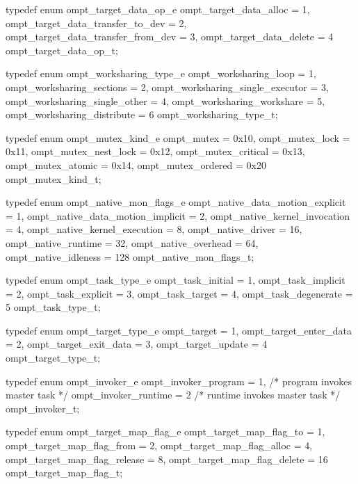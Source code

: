 \documentclass{article}
\begin{document}
\begin{boxedcode}
typedef enum ompt\_target\_data\_op\_e {
  ompt\_target\_data\_alloc              = 1,
  ompt\_target\_data\_transfer\_to\_dev    = 2,
  ompt\_target\_data\_transfer\_from\_dev  = 3,
  ompt\_target\_data\_delete             = 4
} ompt\_target\_data\_op\_t;

typedef enum ompt\_worksharing\_type\_e {
  ompt\_worksharing\_loop               = 1, 
  ompt\_worksharing\_sections           = 2,
  ompt\_worksharing\_single\_executor    = 3,
  ompt\_worksharing\_single\_other       = 4,
  ompt\_worksharing\_workshare          = 5,
  ompt\_worksharing\_distribute         = 6
} ompt\_worksharing\_type\_t;

typedef enum ompt\_mutex\_kind\_e {
  ompt\_mutex                          = 0x10,
  ompt\_mutex\_lock                     = 0x11,
  ompt\_mutex\_nest\_lock                = 0x12,
  ompt\_mutex\_critical                 = 0x13,
  ompt\_mutex\_atomic                   = 0x14,
  ompt\_mutex\_ordered                  = 0x20
} ompt\_mutex\_kind\_t;

typedef enum ompt\_native\_mon\_flags\_e {
  ompt\_native\_data\_motion\_explicit    = 1,
  ompt\_native\_data\_motion\_implicit    = 2,
  ompt\_native\_kernel\_invocation       = 4,
  ompt\_native\_kernel\_execution        = 8,
  ompt\_native\_driver                  = 16,
  ompt\_native\_runtime                 = 32,
  ompt\_native\_overhead                = 64,
  ompt\_native\_idleness                = 128
} ompt\_native\_mon\_flags\_t;

typedef enum  ompt\_task\_type\_e {
  ompt\_task\_initial                   = 1,
  ompt\_task\_implicit                  = 2,
  ompt\_task\_explicit                  = 3,
  ompt\_task\_target                    = 4,
  ompt\_task\_degenerate                = 5
} ompt\_task\_type\_t;

typedef enum ompt\_target\_type\_e {
  ompt\_target                         = 1,
  ompt\_target\_enter\_data              = 2,
  ompt\_target\_exit\_data               = 3,
  ompt\_target\_update                  = 4
} ompt\_target\_type\_t;

typedef enum ompt\_invoker\_e {
  ompt\_invoker\_program                = 1,    /* program invokes master task                 */
  ompt\_invoker\_runtime                = 2     /* runtime invokes master task                 */
} ompt\_invoker\_t;

typedef enum ompt\_target\_map\_flag\_e {
  ompt\_target\_map\_flag\_to             = 1,
  ompt\_target\_map\_flag\_from           = 2,
  ompt\_target\_map\_flag\_alloc          = 4,
  ompt\_target\_map\_flag\_release        = 8, 
  ompt\_target\_map\_flag\_delete         = 16
} ompt\_target\_map\_flag\_t;


\end{boxedcode}
\end{document}
